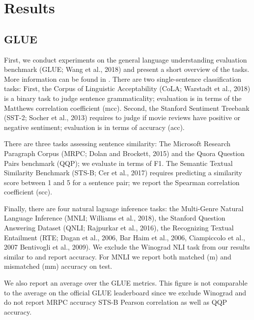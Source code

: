 \documentclass[11pt,a4paper]{article}
\begin{document}
\section{Results}
     
\subsection{GLUE}
\label{sec:glue}

First, we conduct experiments on the general language understanding evaluation benchmark (GLUE; Wang et al., 2018)\nocite{wang2018glue} and present a short overview of the tasks. More information can be found in \citet{wang2018glue}. 
There are two single-sentence classification tasks: 
First, the Corpus of Linguistic Acceptability (CoLA; Warstadt et al., 2018)\nocite{warstadt2018cola} is a binary task to judge sentence grammaticality; evaluation is in terms of the Matthews correlation coefficient (mcc).
Second, the Stanford Sentiment Treebank (SST-2; Socher et al., 2013)\nocite{socher2013sst2} requires to judge if movie reviews have positive or negative sentiment; evaluation is in terms of accuracy (acc).

There are three tasks assessing sentence similarity:
The Microsoft Research Paragraph Corpus (MRPC; Dolan and Brockett, 2015)\nocite{dolan2005mrpc} and the Quora Question Pairs benchmark (QQP); we evaluate in terms of F1.
The Semantic Textual Similarity Benchmark (STS-B; Cer et al., 2017)\nocite{cer2017stsb} requires predicting a similarity score between 1 and 5 for a sentence pair; we report the Spearman correlation coefficient (scc).

Finally, there are four natural laguage inference tasks: the Multi-Genre Natural Language Inference (MNLI; Williams et al., 2018)\nocite{williams2017mnli}, the Stanford Question Answering Dataset (QNLI; Rajpurkar et al., 2016)\nocite{rajpurkar2016squad}, the Recognizing Textual Entailment (RTE; Dagan et al., 2006, Bar Haim et al., 2006, Ciampiccolo et al., 2007 Bentivogli et al., 2009)\nocite{dagan2006rte1,haim2006rte2,giampiccolo2007rte3,bentivogli2009rte}. 
We exclude the Winograd NLI task from our results similar to \citet{radford2018unsup,devlin2018bert} and report accuracy. 
For MNLI we report both matched (m) and mismatched (mm) accuracy on test.

We also report an average over the GLUE metrics. This figure is not comparable to the average on the official GLUE leaderboard since we exclude Winograd and do not report MRPC accuracy STS-B Pearson correlation as well as QQP accuracy.
\end{document}
